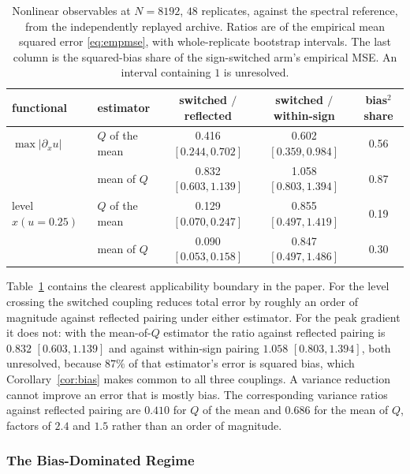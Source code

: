 \documentclass[smallextended,nospthms]{svjour3}
\theoremstyle{plain}
\theoremstyle{definition}
\theoremstyle{remark}
\numberwithin{equation}{section}
\begin{document}
\begin{table}[htbp]
\centering
\caption{Nonlinear observables at $N=8192$, $48$ replicates, against the
spectral reference, from the independently replayed archive. Ratios are of the
empirical mean squared error \eqref{eq:empmse}, with whole-replicate bootstrap
intervals. The last column is the squared-bias share of the sign-switched arm's
empirical MSE. An interval containing $1$ is unresolved.}
\label{tab:nonlinear}
\small
\small
\setlength{\tabcolsep}{3pt}
\begin{tabular}{llccc}
\toprule
functional & estimator & \shortstack{switched $/$\\reflected} & \shortstack{switched $/$\\within-sign} & \shortstack{bias$^2$\\share}\\
\midrule
$\max|\partial_x u|$ & $Q$ of the mean      & 0.416 $[0.244,0.702]$ & 0.602 $[0.359,0.984]$ & 0.56\\
                     & mean of $Q$          & 0.832 $[0.603,1.139]$ & 1.058 $[0.803,1.394]$ & 0.87\\
level $x(u=0.25)$    & $Q$ of the mean      & 0.129 $[0.070,0.247]$ & 0.855 $[0.497,1.419]$ & 0.19\\
                     & mean of $Q$          & 0.090 $[0.053,0.158]$ & 0.847 $[0.497,1.486]$ & 0.30\\
\bottomrule
\end{tabular}
\end{table}

Table~\ref{tab:nonlinear} contains the clearest applicability boundary in the
paper. For the level crossing the switched coupling reduces total error by
roughly an order of magnitude against reflected pairing under either estimator.
For the peak gradient it does not: with the mean-of-$Q$ estimator the ratio
against reflected pairing is $0.832$ $[0.603,1.139]$ and against within-sign
pairing $1.058$ $[0.803,1.394]$, both unresolved, because $87\%$ of that
estimator's error is squared bias, which Corollary~\ref{cor:bias} makes common
to all three couplings. A variance reduction cannot improve an error that is
mostly bias. The corresponding variance ratios against reflected pairing are
$0.410$ for $Q$ of the mean and $0.686$ for the mean of $Q$, factors of $2.4$
and $1.5$ rather than an order of magnitude.

\subsubsection{The Bias-Dominated Regime}
\label{sec:biasregime}
\end{document}
